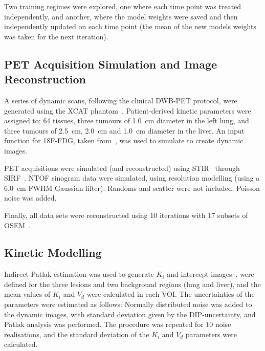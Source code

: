                 Two training regimes were explored, one where each time point was treated independently, and another, where the model weights were saved and then independently updated on each time point (the mean of the new models weights was taken for the next iteration).
                
            
            \subsection{PET Acquisition Simulation and Image Reconstruction} \label{sec:pseudo_bayesian_dip_denoising_as_a_preprocessing_step_for_kinetic_modelling_in_dynamic_pet_appendix_methods_pet_acquisition_simulation_and_image_reconstruction}
                A series of dynamic scans, following the clinical \gls{DWB}-\gls{PET} protocol, were generated using the \gls{XCAT} phantom~\cite{segars4DXCATPhantom2010}. Patient-derived kinetic parameters were assigned to; $64$ tissues, three tumours of \SI{1.0}{\centi\meter} diameter in the left lung, and three tumours of \SI{2.5}{\centi\meter}, \SI{2.0}{\centi\meter} and \SI{1.0}{\centi\meter} diameter in the liver. An input function for \gls{18F-FDG}, taken from~\cite{langsjoEffectsSubanestheticKetamine2004}, was used to simulate  to create dynamic images.
        
                \gls{PET} acquisitions were simulated (and reconstructed) using \gls{STIR}~\cite{Thielemans2012} through \gls{SIRF}~\cite{Ovtchinnikov2017}. \gls{NTOF} sinogram data were simulated, using resolution modelling (using a \SI{6.0}{\centi\meter} \gls{FWHM} Gaussian filter). Randoms and scatter were not included. Poisson noise was added.%
        
                Finally, all data sets were reconstructed using $10$ iterations with $17$ subsets of \gls{OSEM}~\cite{Hudson1994}.
        
            
            \subsection{Kinetic Modelling} \label{sec:pseudo_bayesian_dip_denoising_as_a_preprocessing_step_for_kinetic_modelling_in_dynamic_pet_appendix_methods_kinetic_modelling}
                Indirect Patlak estimation was used to generate $K_i$ and intercept images~\cite{patlak1983GraphicalEvaluationBloodtoBrain}.  were defined for the three lesions and two background regions (lung and liver), and the mean values of $K_i$ and $V_d$ were calculated in each \gls{VOI}. The uncertainties of the parameters were estimated as follows: Normally distributed noise was added to the dynamic images, with standard deviation given by the \gls{DIP}-uncertainty, and Patlak analysis was performed. The procedure was repeated for $10$ noise realisations, and the standard deviation of the $K_i$ and $V_d$ parameters were calculated.
                
